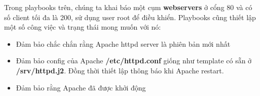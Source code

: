 Trong playbooks trên, chúng ta khai báo một cụm \textbf{webservers} ở cổng 80 và có số client tối đa là 200, sử dụng user root để điều khiển. Playbooks cũng thiết lập một số công việc và trạng thái mong muốn với nó:

\begin{itemize}
\item Đảm bảo chắc chắn rằng Apache httpd server là phiên bản mới nhất
\item Đảm bảo config của Apache \textbf{/etc/httpd.conf} giống như template có sẵn ở \textbf{/srv/httpd.j2}. Đồng thời thiết lập thông báo khi Apache restart.
\item Đảm bảo rằng Apache đã được khởi động
\end{itemize}



